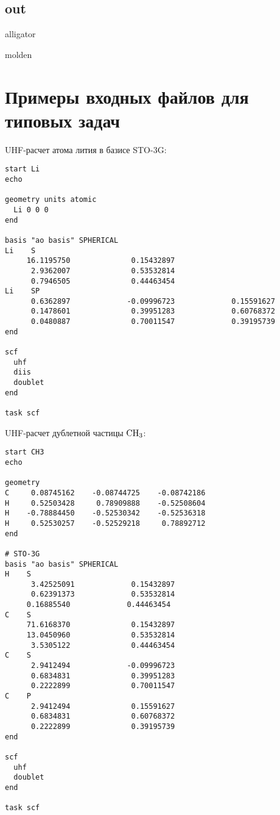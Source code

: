 \documentclass[a4paper, 12pt]{article}
\begin{document}
\subsection{out}
\begin{labeling}{alligator}
\item [molden]
\end{labeling}
\section{Примеры входных файлов для типовых задач}\label{sec:examples}

UHF-расчет атома лития в базисе STO-3G:
\begin{lstlisting}
start Li
echo

geometry units atomic
  Li 0 0 0
end

basis "ao basis" SPHERICAL
Li    S
     16.1195750              0.15432897       
      2.9362007              0.53532814       
      0.7946505              0.44463454       
Li    SP
      0.6362897             -0.09996723             0.15591627       
      0.1478601              0.39951283             0.60768372       
      0.0480887              0.70011547             0.39195739       
end

scf
  uhf
  diis
  doublet
end

task scf
\end{lstlisting}

\bigskip

UHF-расчет дублетной частицы $\rm CH_3$:
\begin{lstlisting}
start CH3
echo

geometry
C     0.08745162    -0.08744725    -0.08742186
H     0.52503428     0.78909888    -0.52508604
H    -0.78884450    -0.52530342    -0.52536318
H     0.52530257    -0.52529218     0.78892712
end

# STO-3G
basis "ao basis" SPHERICAL
H    S
      3.42525091             0.15432897       
      0.62391373             0.53532814       
     0.16885540             0.44463454  
C    S
     71.6168370              0.15432897       
     13.0450960              0.53532814       
      3.5305122              0.44463454       
C    S
      2.9412494             -0.09996723
      0.6834831              0.39951283    
      0.2222899              0.70011547            
C    P
      2.9412494              0.15591627       
      0.6834831              0.60768372       
      0.2222899              0.39195739    
end

scf
  uhf
  doublet
end

task scf
\end{lstlisting}


{}
\end{document}
